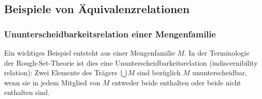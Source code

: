 \documentclass[main.tex]{subfiles}
\begin{document}
\subsection{Beispiele von Äquivalenzrelationen}

\subsubsection{Ununterscheidbarkeitsrelation einer Mengenfamilie}

Ein wichtiges Beispiel entsteht aus einer Mengenfamilie \(M\). In der
Terminologie der Rough-Set-Theorie ist dies eine
Ununterscheidbarkeitsrelation (indiscernibility relation): Zwei Elemente des
Trägers \(\bigcup M\) sind bezüglich \(M\) ununterscheidbar, wenn sie in jedem
Mitglied von \(M\) entweder beide enthalten oder beide nicht enthalten sind.

\end{document}
